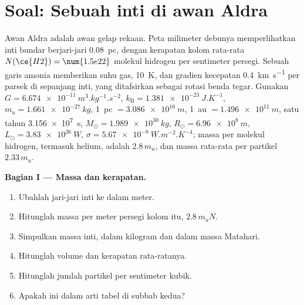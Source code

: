 \section{Soal: Sebuah inti di awan Aldra}

\begin{problem}
\label{pb:b2:ism-star-formation:1}
Awan Aldra adalah awan gelap rekaan. Peta milimeter debunya
memperlihatkan inti bundar berjari-jari \qty{0.08}{pc}, dengan kerapatan kolom rata-rata
$N(\ce{H2}) = \num{1.5e22}$ molekul hidrogen per sentimeter persegi. Sebuah
garis amonia memberikan suhu gas, \qty{10}{K}, dan gradien kecepatan
\qty{0.4}{km.s^{-1}} per parsek di sepanjang inti, yang ditafsirkan sebagai rotasi
benda tegar. Gunakan $G = \qty{6.674e-11}{m^3.kg^{-1}.s^{-2}}$,
$k_{\mathrm B} = \qty{1.381e-23}{J.K^{-1}}$, $m_u = \qty{1.661e-27}{kg}$,
\qty{1}{pc} $= \qty{3.086e16}{m}$, \qty{1}{au} $= \qty{1.496e11}{m}$, satu tahun
\qty{3.156e7}{s}, $M_\odot = \qty{1.989e30}{kg}$, $R_\odot = \qty{6.96e8}{m}$,
$L_\odot = \qty{3.83e26}{W}$, $\sigma = \qty{5.67e-8}{W.m^{-2}.K^{-4}}$; massa per
molekul hidrogen, termasuk helium, adalah $2.8\,m_u$, dan massa rata-rata
per partikel $2.33\,m_u$.

\medskip
\noindent\textbf{Bagian I --- Massa dan kerapatan.}
\begin{enumerate}
  \item Ubahlah jari-jari inti ke dalam meter.
  \item Hitunglah massa per meter persegi kolom itu, $2.8\,m_u N$.
  \item Simpulkan massa inti, dalam kilogram dan dalam massa Matahari.
  \item Hitunglah volume dan kerapatan rata-ratanya.
  \item Hitunglah jumlah partikel per sentimeter kubik.
  \item Apakah ini  dalam arti tabel di subbab kedua?
\end{enumerate}


\end{problem}
